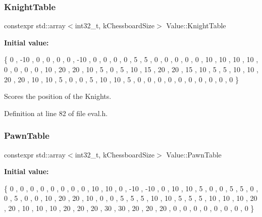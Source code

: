 \subsubsection{\texorpdfstring{Knight\+Table}{KnightTable}}
{\footnotesize\ttfamily constexpr std\+::array$<$int32\+\_\+t, k\+Chessboard\+Size$>$ Value\+::\+Knight\+Table}

{\bfseries Initial value\+:}
\begin{DoxyCode}
\{
        0   ,   -10 ,   0   ,   0   ,   0   ,   0   ,   -10 ,   0   ,
        0   ,   0   ,   0   ,   5   ,   5   ,   0   ,   0   ,   0   ,
        0   ,   0   ,   10  ,   10  ,   10  ,   10  ,   0   ,   0   ,
        0   ,   0   ,   10  ,   20  ,   20  ,   10  ,   5   ,   0   ,
        5   ,   10  ,   15  ,   20  ,   20  ,   15  ,   10  ,   5   ,
        5   ,   10  ,   10  ,   20  ,   20  ,   10  ,   10  ,   5   ,
        0   ,   0   ,   5   ,   10  ,   10  ,   5   ,   0   ,   0   ,
        0   ,   0   ,   0   ,   0   ,   0   ,   0   ,   0   ,   0       
    \}
\end{DoxyCode}


Scores the position of the Knights. 



Definition at line 82 of file eval.\+h.

\mbox{\label{namespaceValue_a8b6c72010096d1ae9eb653c5be418db0}} 
\subsubsection{\texorpdfstring{Pawn\+Table}{PawnTable}}
{\footnotesize\ttfamily constexpr std\+::array$<$int32\+\_\+t, k\+Chessboard\+Size$>$ Value\+::\+Pawn\+Table}

{\bfseries Initial value\+:}
\begin{DoxyCode}
\{
        0   ,   0   ,   0   ,   0   ,   0   ,   0   ,   0   ,   0   ,
        10  ,   10  ,   0   ,   -10 ,   -10 ,   0   ,   10  ,   10  ,
        5   ,   0   ,   0   ,   5   ,   5   ,   0   ,   0   ,   5   ,
        0   ,   0   ,   10  ,   20  ,   20  ,   10  ,   0   ,   0   ,
        5   ,   5   ,   5   ,   10  ,   10  ,   5   ,   5   ,   5   ,
        10  ,   10  ,   10  ,   20  ,   20  ,   10  ,   10  ,   10  ,
        20  ,   20  ,   20  ,   30  ,   30  ,   20  ,   20  ,   20  ,
        0   ,   0   ,   0   ,   0   ,   0   ,   0   ,   0   ,   0   
    \}
\end{DoxyCode}


